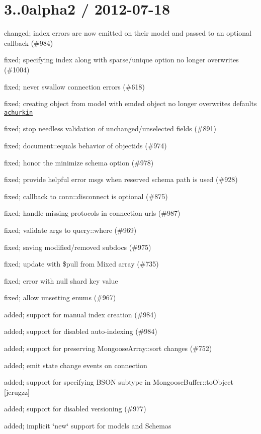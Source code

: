 \section*{3..\+0alpha2 / 2012-\/07-\/18 }


\begin{DoxyItemize}
\item changed; index errors are now emitted on their model and passed to an optional callback (\#984)
\item fixed; specifying index along with sparse/unique option no longer overwrites (\#1004)
\item fixed; never swallow connection errors (\#618)
\item fixed; creating object from model with emded object no longer overwrites defaults \href{#859}{\tt achurkin}
\item fixed; stop needless validation of unchanged/unselected fields (\#891)
\item fixed; document\+::equals behavior of objectids (\#974)
\item fixed; honor the minimize schema option (\#978)
\item fixed; provide helpful error msgs when reserved schema path is used (\#928)
\item fixed; callback to conn\+::disconnect is optional (\#875)
\item fixed; handle missing protocols in connection urls (\#987)
\item fixed; validate args to query\+::where (\#969)
\item fixed; saving modified/removed subdocs (\#975)
\item fixed; update with \$pull from Mixed array (\#735)
\item fixed; error with null shard key value
\item fixed; allow unsetting enums (\#967)
\item added; support for manual index creation (\#984)
\item added; support for disabled auto-\/indexing (\#984)
\item added; support for preserving Mongoose\+Array\+::sort changes (\#752)
\item added; emit state change events on connection
\item added; support for specifying B\+S\+ON subtype in Mongoose\+Buffer\+::to\+Object \mbox{[}jcrugzz\mbox{]}
\item added; support for disabled versioning (\#977)
\item added; implicit \char`\"{}new\char`\"{} support for models and Schemas
\end{DoxyItemize}

